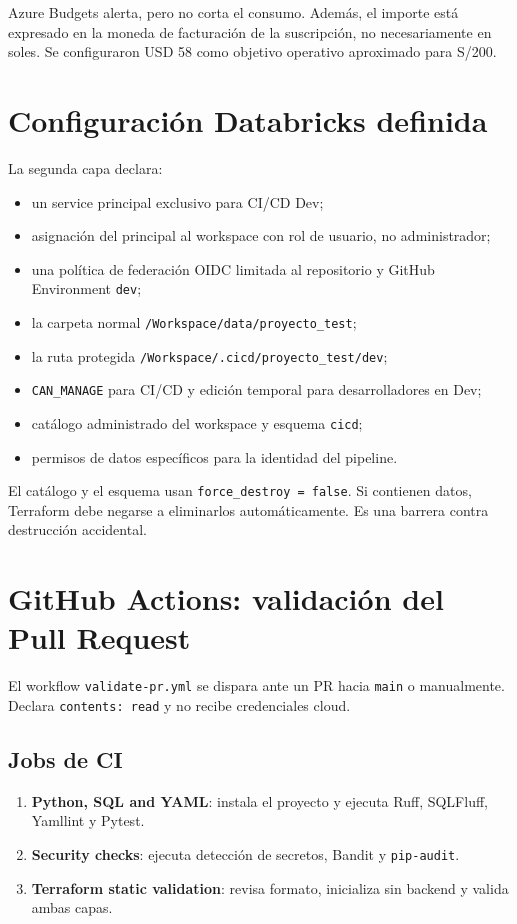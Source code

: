 \documentclass[11pt,a4paper]{article}
\begin{document}
Azure Budgets alerta, pero no corta el consumo. Además, el importe está expresado en la moneda de
facturación de la suscripción, no necesariamente en soles. Se configuraron USD 58 como objetivo
operativo aproximado para S/200.

\section{Configuración Databricks definida}

La segunda capa declara:

\begin{itemize}
  \item un service principal exclusivo para CI/CD Dev;
  \item asignación del principal al workspace con rol de usuario, no administrador;
  \item una política de federación OIDC limitada al repositorio y GitHub Environment \texttt{dev};
  \item la carpeta normal \texttt{/Workspace/data/proyecto\_test};
  \item la ruta protegida \texttt{/Workspace/.cicd/proyecto\_test/dev};
  \item \texttt{CAN\_MANAGE} para CI/CD y edición temporal para desarrolladores en Dev;
  \item catálogo administrado del workspace y esquema \texttt{cicd};
  \item permisos de datos específicos para la identidad del pipeline.
\end{itemize}

El catálogo y el esquema usan \texttt{force\_destroy = false}. Si contienen datos, Terraform debe
negarse a eliminarlos automáticamente. Es una barrera contra destrucción accidental.

\section{GitHub Actions: validación del Pull Request}

El workflow \texttt{validate-pr.yml} se dispara ante un PR hacia \texttt{main} o manualmente. Declara
\texttt{contents: read} y no recibe credenciales cloud.

\subsection{Jobs de CI}

\begin{enumerate}
  \item \textbf{Python, SQL and YAML}: instala el proyecto y ejecuta Ruff, SQLFluff, Yamllint y Pytest.
  \item \textbf{Security checks}: ejecuta detección de secretos, Bandit y \texttt{pip-audit}.
  \item \textbf{Terraform static validation}: revisa formato, inicializa sin backend y valida ambas capas.
\end{enumerate}
\end{document}
